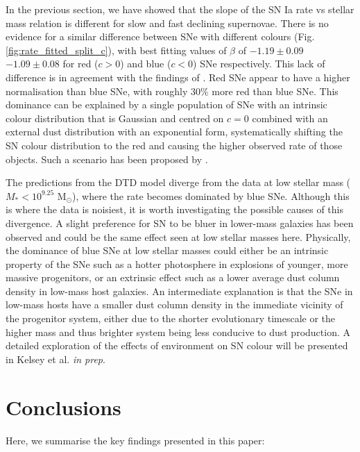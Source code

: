 \documentclass[fleqn,usenatbib]{mnras}
\begin{document}
In the previous section, we have showed that the slope of the SN Ia rate vs stellar mass relation is different for slow and fast declining supernovae. There is no evidence for a similar difference between SNe with different colours (Fig. \ref{fig:rate_fitted_split_c}), with best fitting values of $\beta$ of $-1.19\pm0.09$ $-1.09\pm0.08$ for red ($c > 0$) and blue ($c<0$) SNe respectively. This lack of difference is in agreement with the findings of \citet{Sullivan2010}. Red SNe appear to have a higher normalisation than blue SNe, with roughly 30\% more red than blue SNe. This dominance can be explained by a single population of SNe with an intrinsic colour distribution that is Gaussian and centred on $c=0$ combined with an external dust distribution with an exponential form, systematically shifting the SN colour distribution to the red and causing the higher observed rate of those objects. Such a scenario has been proposed by \citet{Brout2020}. 

The predictions from the DTD model diverge from the data at low stellar mass ($M_* <10^{9.25}$ M$_{\odot}$), where the rate becomes dominated by blue SNe. Although this is where the data is noisiest, it is worth investigating the possible causes of this divergence. A slight preference for SN to be bluer in lower-mass galaxies has been observed \citep{Scolnic2018,Brout2019,Smith2020,kelsey2021} and could be the same effect seen at low stellar masses here. Physically, the dominance of blue SNe at low stellar masses could either be an intrinsic property of the SNe such as a hotter photosphere in explosions of younger, more massive progenitors, or an extrinsic effect such as a lower average dust column density in low-mass host galaxies. An intermediate explanation is that the SNe in low-mass hosts have a smaller dust column density in the immediate vicinity of the progenitor system, either due to the shorter evolutionary timescale or the higher mass and thus brighter system being less conducive to dust production. A detailed exploration of the effects of environment on SN colour will be presented in Kelsey et al. \textit{in prep}.

\section{Conclusions}
\label{sec:conclusion}

Here, we summarise the key findings presented in this paper:
\end{document}
